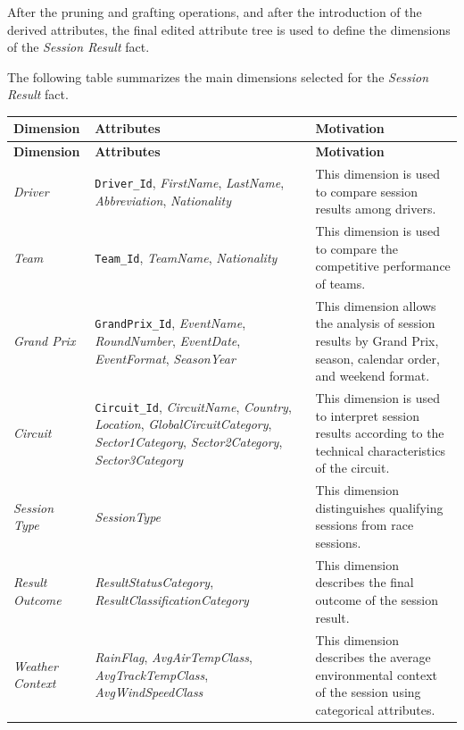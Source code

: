 \documentclass[a4paper,11pt]{article}
\begin{document}
	After the pruning and grafting operations, and after the introduction of the derived
	attributes, the final edited attribute tree is used to define the dimensions of the
	\textit{Session Result} fact.
	
	The following table summarizes the main dimensions selected for the
	\textit{Session Result} fact.
	
	\begin{longtable}{|p{3cm}|p{6cm}|p{8cm}|}
		\hline
		\textbf{Dimension} & \textbf{Attributes} & \textbf{Motivation} \\
		\hline
		\endfirsthead
		
		\hline
		\textbf{Dimension} & \textbf{Attributes} & \textbf{Motivation} \\
		\hline
		\endhead
		
		\textit{Driver}
		& \texttt{Driver\_Id}, \textit{FirstName}, \textit{LastName}, \textit{Abbreviation},
		\textit{Nationality}
		& This dimension is used to compare session results among drivers. \\
		\hline
		
		\textit{Team}
		& \texttt{Team\_Id}, \textit{TeamName}, \textit{Nationality}
		& This dimension is used to compare the competitive performance of teams. \\
		\hline
		
		\textit{Grand Prix}
		& \texttt{GrandPrix\_Id}, \textit{EventName}, \textit{RoundNumber}, \textit{EventDate},
		\textit{EventFormat}, \textit{SeasonYear}
		& This dimension allows the analysis of session results by Grand Prix, season,
		calendar order, and weekend format. \\
		\hline
		
		\textit{Circuit}
		& \texttt{Circuit\_Id}, \textit{CircuitName}, \textit{Country}, \textit{Location},
		\textit{GlobalCircuitCategory}, \textit{Sector1Category}, \textit{Sector2Category},
		\textit{Sector3Category}
		& This dimension is used to interpret session results according to the technical
		characteristics of the circuit. \\
		\hline
		
		\textit{Session Type}
		& \textit{SessionType}
		& This dimension distinguishes qualifying sessions from race sessions.  \\
		\hline
		
		\textit{Result Outcome}
		& \textit{ResultStatusCategory}, \textit{ResultClassificationCategory}
		& This dimension describes the final outcome of the session result. \\
		\hline
		
		\textit{Weather Context}
		& \textit{RainFlag}, \textit{AvgAirTempClass}, \textit{AvgTrackTempClass},
		\textit{AvgWindSpeedClass}
		& This dimension describes the average environmental context of the session using
		categorical attributes. \\
		\hline
		
	\end{longtable}
	
\end{document}
